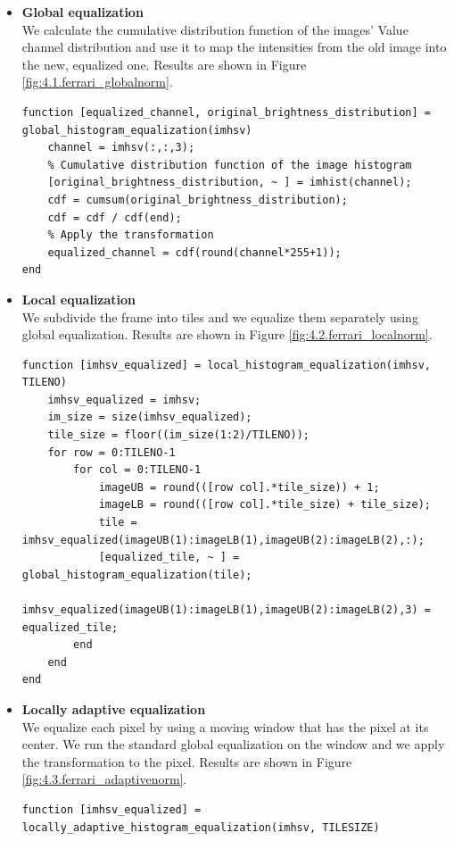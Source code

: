 \documentclass[tikz,14pt,fleqn]{article}
\begin{document}
\begin{itemize}
    \item \textbf{Global equalization}\\
    We calculate the cumulative distribution function of the images' Value channel distribution and use it to map the intensities from the old image into the new, equalized one. Results are shown in Figure \ref{fig:4.1.ferrari_globalnorm}.
    \begin{verbatim} 
function [equalized_channel, original_brightness_distribution] = global_histogram_equalization(imhsv)
    channel = imhsv(:,:,3);
    % Cumulative distribution function of the image histogram
    [original_brightness_distribution, ~ ] = imhist(channel);
    cdf = cumsum(original_brightness_distribution);
    cdf = cdf / cdf(end);
    % Apply the transformation
    equalized_channel = cdf(round(channel*255+1));
end
    \end{verbatim}
    \item \textbf{Local equalization}\\
    We subdivide the frame into tiles and we equalize them separately using global equalization. Results are shown in Figure \ref{fig:4.2.ferrari_localnorm}.
    \begin{verbatim} 
function [imhsv_equalized] = local_histogram_equalization(imhsv, TILENO)
    imhsv_equalized = imhsv;
    im_size = size(imhsv_equalized);
    tile_size = floor((im_size(1:2)/TILENO));
    for row = 0:TILENO-1
        for col = 0:TILENO-1
            imageUB = round(([row col].*tile_size)) + 1;
            imageLB = round(([row col].*tile_size) + tile_size);
            tile = imhsv_equalized(imageUB(1):imageLB(1),imageUB(2):imageLB(2),:);
            [equalized_tile, ~ ] = global_histogram_equalization(tile);
            imhsv_equalized(imageUB(1):imageLB(1),imageUB(2):imageLB(2),3) = equalized_tile;
        end
    end
end
    \end{verbatim}
    \item \textbf{Locally adaptive equalization}\\
    We equalize each pixel by using a moving window that has the pixel at its center. We run the standard global equalization on the window and we apply the transformation to the pixel. Results are shown in Figure \ref{fig:4.3.ferrari_adaptivenorm}.
    \begin{verbatim} 
function [imhsv_equalized] = locally_adaptive_histogram_equalization(imhsv, TILESIZE)

\end{verbatim}
\end{itemize}
\end{document}
